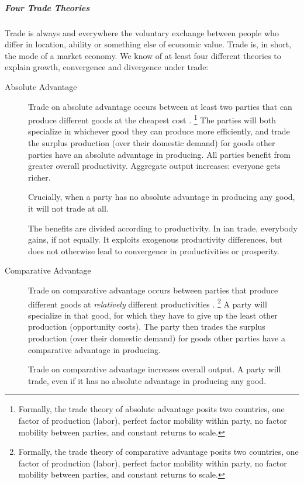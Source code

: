 \subparagraph{Four Trade Theories}  \label{sec:trade-theories} Trade is always and everywhere the voluntary exchange between people who differ in location, ability or something else of economic value.
Trade is, in short, the mode of a market economy.
We know of at least four different theories to explain growth, convergence and divergence under trade:

\begin{description}
	\item[Absolute Advantage] \label{itm:absolute-advantage}Trade on absolute advantage occurs between at least two parties that can produce different goods at the cheapest cost \citep{Smith-1776-lq}.
	\footnote{
		Formally, the trade theory of absolute advantage posits two countries, one factor of production (labor), perfect factor mobility within party, no factor mobility between parties, and constant returns to scale.
	}
The parties will both specialize in whichever good they can produce more efficiently, and trade the surplus production (over their domestic demand) for goods other parties have an absolute advantage in producing.
All parties benefit from greater overall productivity.
Aggregate output increases:
everyone gets richer.

	Crucially, when a party has no absolute advantage in producing any good, it will not trade at all.

	The benefits are divided according to productivity.
	In \citeauthor{Smith-1776-lq}ian trade, everybody gains, if not equally.
It exploits exogenous productivity differences, but does not otherwise lead to convergence in productivities or prosperity.

	\item[Comparative Advantage]\label{itm:comparative-advantage} Trade on comparative advantage occurs between parties that produce different goods at \emph{relatively} different productivities \citep{Ricardo1817}.
	\footnote{
		Formally, the trade theory of comparative advantage posits two countries, one factor of production (labor), perfect factor mobility within party, no factor mobility between parties, and constant returns to scale.
	}
A party will specialize in that good, for which they have to give up the least other production (opportunity costs).
The party then trades the surplus production (over their domestic demand) for goods other parties have a comparative advantage in producing.

	Trade on comparative advantage increases overall output.
	A party will trade, even if it has no absolute advantage in producing any good.


\end{description}
